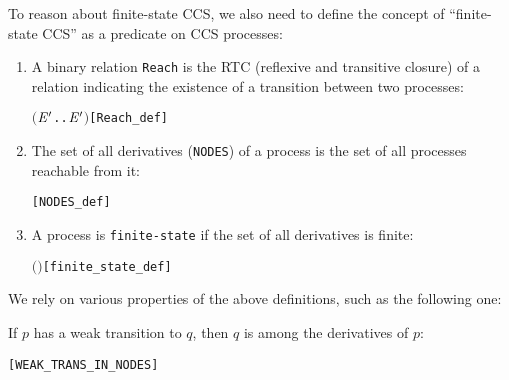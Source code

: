 To reason about finite-state CCS, we also need to define the concept
of ``finite-state CCS'' as a predicate on CCS processes:
\begin{definition}
  \mbox{}
\begin{enumerate}
\item A binary relation \texttt{Reach} is the RTC (reflexive and transitive
  closure) of a relation indicating the existence of a transition between two processes:
\begin{alltt}
 \HOLTokenDefEquality{} \ensuremath{(}\HOLTokenLambda{} \ensuremath{\HOLBoundVar{E}\sp{\prime{}}}. \HOLSymConst{\HOLTokenExists{}}.  \HOLTokenTransBegin{}\HOLTokenTransEnd \ensuremath{\HOLBoundVar{E}\sp{\prime{}}}\ensuremath{)}\HOLSymConst{\HOLTokenSupStar{}}\hfill[Reach_def]
\end{alltt}
\item The set of all derivatives (\texttt{NODES}) of a process is the
  set of all processes reachable from it:
\begin{alltt}
  \HOLTokenDefEquality{} \HOLTokenLeftbrace{} \HOLTokenBar{}   \HOLTokenRightbrace{}\hfill[NODES_def]
\end{alltt}
\item A process is \texttt{finite-state} if the set of all derivatives is finite:
\begin{alltt}
  \HOLTokenDefEquality{}  \ensuremath{(} \ensuremath{)}\hfill[finite_state_def]
\end{alltt}
\end{enumerate}
\end{definition}
We rely on various 
 properties of the above definitions, such as the following one:
\begin{proposition}
If $p$ has a weak transition to $q$, then $q$ is among the derivatives of $p$:
\begin{alltt}
\HOLTokenTurnstile{}  \HOLTokenWeakTransBegin{}\HOLTokenWeakTransEnd {} \HOLSymConst{\HOLTokenImp{}}  \HOLSymConst{\HOLTokenIn{}}  \hfill[WEAK_TRANS_IN_NODES]
\end{alltt}
\end{proposition}

